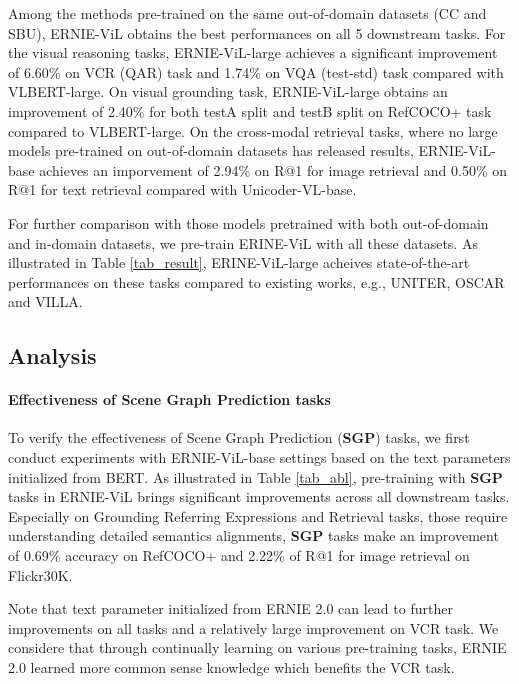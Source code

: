\documentclass[letterpaper]{article} \usepackage{aaai21}  \usepackage{times}  \usepackage{helvet} \usepackage{courier}  \usepackage[hyphens]{url}  \usepackage{graphicx} \urlstyle{rm} \def\UrlFont{\rm}  \usepackage{natbib}  \usepackage{caption} \frenchspacing  \setlength{\pdfpagewidth}{8.5in}  \setlength{\pdfpageheight}{11in}  \usepackage{cite}
\begin{document}
Among the methods pre-trained on the same out-of-domain datasets (CC and SBU),  
ERNIE-ViL obtains the best performances on all 5 downstream tasks. For the visual reasoning tasks, ERNIE-ViL-large achieves a significant improvement of 6.60\% on VCR (QAR) task and 1.74\% on VQA (test-std) task compared with VLBERT-large. On visual grounding task, ERNIE-ViL-large obtains an improvement of 2.40\% for both testA split and testB split on RefCOCO+ task compared to VLBERT-large. On the cross-modal retrieval tasks, where no large models pre-trained on out-of-domain datasets has released results, ERNIE-ViL-base achieves an imporvement of 2.94\% on R@1 for image retrieval and 0.50\% on R@1 for text retrieval compared with Unicoder-VL-base.

For further comparison with those models pretrained with both out-of-domain and in-domain datasets, we  pre-train ERINE-ViL with all these datasets. As illustrated in Table \ref{tab_result}, ERINE-ViL-large acheives state-of-the-art performances on these tasks compared to existing works, e.g., UNITER, OSCAR\cite{li2020oscar} and VILLA\cite{gan2020large}.



\subsection{Analysis}

\paragraph{Effectiveness of Scene Graph Prediction tasks} 

To verify the effectiveness of Scene Graph Prediction (\textbf{SGP}) tasks, we first conduct experiments with ERNIE-ViL-base settings based on the text parameters  initialized from BERT. As illustrated in Table \ref{tab_abl}, pre-training with \textbf{SGP} tasks
in ERNIE-ViL brings significant improvements across all downstream tasks. Especially on Grounding Referring Expressions and Retrieval tasks, those require understanding detailed semantics alignments, \textbf{SGP} tasks make an improvement of 0.69\% accuracy on RefCOCO+ and 2.22\% of R@1 for image retrieval on Flickr30K.


Note that text parameter initialized from ERNIE 2.0 can  lead to further improvements on all tasks and a relatively large improvement on VCR task. We considere that through continually learning on various pre-training tasks, ERNIE 2.0 learned more common sense knowledge which benefits the VCR task. 
\end{document}
